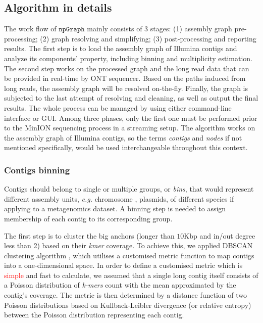 \documentclass[10pt,letterpaper]{article}
\newcommand\replace[1]{\textcolor{red}{#1}}
\newcommand{\npgraph}{$\mathtt{npGraph}$}
\newcommand{\EG}{\emph{e.g.}}
\begin{document}
\subsection*{Algorithm in details}
The work flow of \npgraph{} mainly consists of 3 stages: (1) assembly graph pre-processing; (2) graph resolving and simplifying; (3) post-processing and reporting results. 
The first step is to load the assembly graph of Illumina contigs and analyze its components' property, including binning and multiplicity estimation.
The second step works on the processed graph and the long read data that can be provided in real-time by ONT sequencer. Based on the paths induced from long reads, the assembly graph will be resolved on-the-fly.
Finally, the graph is subjected to the last attempt of resolving and cleaning, as well as output the final results. The whole process can be managed by using either command-line interface or GUI.
Among three phases, only the first one must be performed prior to the MinION sequencing process in a streaming setup.
The algorithm works on the assembly graph of Illumina contigs, so the terms \emph{contigs} and \emph{nodes} if not mentioned specifically, would be used interchangeable throughout this context.
\subsubsection*{Contigs binning}
Contigs should belong to single or multiple groups, or \emph{bins}, that would represent different assembly units, \EG{} chromosome , plasmids, of different species if applying to a metagenomics dataset. 
A binning step is needed to assign membership of each contig to its corresponding group. 

The first step is to cluster the big anchors (longer than $10$Kbp and in/out degree less than 2) based on their \emph{kmer} coverage.
To achieve this, we applied DBSCAN clustering algorithm \cite{Ester96adensity-based}, which utilises a customised metric function to map contigs into a one-dimensional space.  In order to 
 define a customised metric which is  \replace{simple} and fast to calculate, we assumed that a single long contig itself consists of a Poisson distribution of \emph{k-mers} count with the mean approximated by the contig's coverage. 
The metric is then determined by a distance function of two Poisson distributions based on Kullback-Leibler divergence (or relative entropy) between the Poisson distribution representing each contig\cite{Kullback1951information}.
\end{document}
